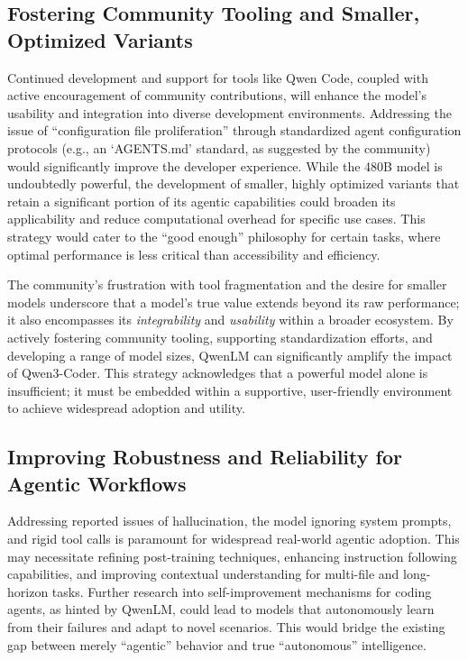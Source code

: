 \subsection{Fostering Community Tooling and Smaller, Optimized Variants}

Continued development and support for tools like Qwen Code, coupled with active encouragement of community contributions, will enhance the model's usability and integration into diverse development environments.\cite{fortuneindia_qwen3coder_2025, qwenlm_qwen3coder_blog_2025, marktechpost_qwen3coder_2025, youtube_qwen3coder_leading_2025, willison_qwen3coder_2025, github_qwenlm_qwencode_2025} Addressing the issue of ``configuration file proliferation'' through standardized agent configuration protocols (e.g., an `AGENTS.md' standard, as suggested by the community) would significantly improve the developer experience.\cite{hackernews_qwen3coder_2025} While the 480B model is undoubtedly powerful, the development of smaller, highly optimized variants that retain a significant portion of its agentic capabilities could broaden its applicability and reduce computational overhead for specific use cases.\cite{unsloth_qwen3coder_local_2025, reddit_localllama_kimi_qwen3coder_2025} This strategy would cater to the ``good enough'' philosophy for certain tasks, where optimal performance is less critical than accessibility and efficiency.\cite{reddit_localllama_kimi_qwen3coder_2025}

The community's frustration with tool fragmentation and the desire for smaller models underscore that a model's true value extends beyond its raw performance; it also encompasses its \textit{integrability} and \textit{usability} within a broader ecosystem.\cite{hackernews_qwen3coder_2025, unsloth_qwen3coder_local_2025, reddit_localllama_kimi_qwen3coder_2025} By actively fostering community tooling, supporting standardization efforts, and developing a range of model sizes, QwenLM can significantly amplify the impact of Qwen3-Coder. This strategy acknowledges that a powerful model alone is insufficient; it must be embedded within a supportive, user-friendly environment to achieve widespread adoption and utility.

\subsection{Improving Robustness and Reliability for Agentic Workflows}

Addressing reported issues of hallucination, the model ignoring system prompts, and rigid tool calls is paramount for widespread real-world agentic adoption.\cite{reddit_localllama_qwen3coder_1_2025, reddit_localllama_kimi_qwen3coder_2025} This may necessitate refining post-training techniques, enhancing instruction following capabilities, and improving contextual understanding for multi-file and long-horizon tasks. Further research into self-improvement mechanisms for coding agents, as hinted by QwenLM, could lead to models that autonomously learn from their failures and adapt to novel scenarios.\cite{qwenlm_qwen3coder_blog_2025} This would bridge the existing gap between merely ``agentic'' behavior and true ``autonomous'' intelligence.

